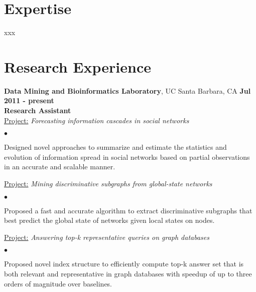\documentclass[margin,line]{res}
\newenvironment{list2}{
  \begin{list}{$\bullet$}{%
      \setlength{\itemsep}{0in}
      \setlength{\parsep}{0in} \setlength{\parskip}{0in}
      \setlength{\topsep}{0in} \setlength{\partopsep}{0in} 
      \setlength{\leftmargin}{0.2in}}}{\end{list}}
\begin{document}
\begin{resume}
\section{\sc Expertise}
xxx
\vspace*{-0.05in}

\section{\sc Research Experience}
{\bf Data Mining and Bioinformatics Laboratory}, UC Santa Barbara, CA \hfill {\bf Jul 2011 - present}
\\{\bf Research Assistant}
\\\underline{Project:} {\em Forecasting information cascades in social networks}
\begin{list2}
\item Designed novel approaches to summarize and estimate the statistics and evolution of information spread in social networks based on partial observations in an accurate and scalable manner.
\end{list2}
\vspace{-0.15in}\underline{Project:} {\em Mining discriminative subgraphs from global-state networks}
\begin{list2}
\item Proposed a fast and accurate algorithm to extract discriminative subgraphs that best predict the global state of networks given local states on nodes.
\end{list2}
\vspace{-0.15in}\underline{Project:} {\em Answering top-k representative queries on graph databases}
\begin{list2}
\item Proposed novel index structure to efficiently compute top-k answer set that is both relevant and representative in graph databases with speedup of up to three orders of magnitude over baselines.
\end{list2}
\vspace*{-0.05in}

\end{resume}
\end{document}
